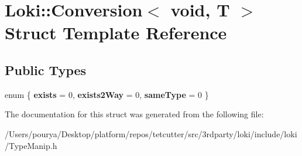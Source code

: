 \hypertarget{structLoki_1_1Conversion_3_01void_00_01T_01_4}{}\section{Loki\+:\+:Conversion$<$ void, T $>$ Struct Template Reference}
\label{structLoki_1_1Conversion_3_01void_00_01T_01_4}
\subsection*{Public Types}
\begin{DoxyCompactItemize}
\item 
\hypertarget{structLoki_1_1Conversion_3_01void_00_01T_01_4_a7f4a810fe1eb58af83e18ab83bfafdc7}{}enum \{ {\bfseries exists} = 0, 
{\bfseries exists2\+Way} = 0, 
{\bfseries same\+Type} = 0
 \}\label{structLoki_1_1Conversion_3_01void_00_01T_01_4_a7f4a810fe1eb58af83e18ab83bfafdc7}

\end{DoxyCompactItemize}


The documentation for this struct was generated from the following file\+:\begin{DoxyCompactItemize}
\item 
/\+Users/pourya/\+Desktop/platform/repos/tetcutter/src/3rdparty/loki/include/loki/Type\+Manip.\+h\end{DoxyCompactItemize}
